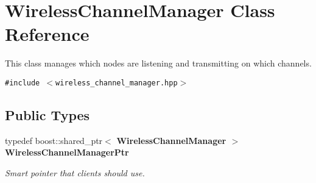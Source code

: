 \section{Wireless\-Channel\-Manager Class Reference}
\label{classWirelessChannelManager}
This class manages which nodes are listening and transmitting on which channels.  


{\tt \#include $<$wireless\_\-channel\_\-manager.hpp$>$}

\subsection*{Public Types}
\begin{CompactItemize}
\item 
typedef boost::shared\_\-ptr$<$ \bf{Wireless\-Channel\-Manager} $>$ \bf{Wireless\-Channel\-Manager\-Ptr}\label{classWirelessChannelManager_edd59ec3ea8cd2f10c265fbdf76e7492}

\begin{CompactList}\small\item\em Smart pointer that clients should use. \item\end{CompactList}\end{CompactItemize}
